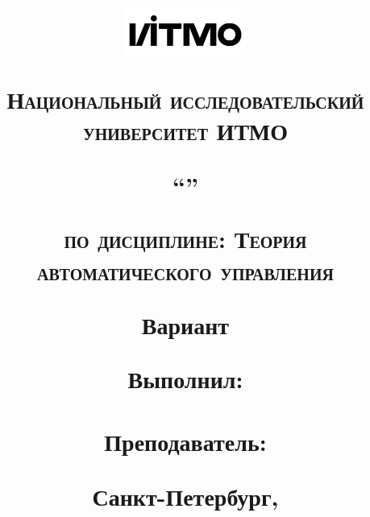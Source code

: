 \begin{titlepage}

  \thispagestyle{empty}
  
  \title{


  \includegraphics[width=4cm]{media/ITMO_logo.png} 

  \begin{center}
  \large\textsc{\textbf{Национальный исследовательский университет ИТМО}}
  \vspace{2em}
  \end{center}


  \begin{center}
    \large\textsc{\textbf{\name}}

    ``\subname'' 

    \large\textsc{\textbf{по дисциплине: Теория автоматического управления}}
    
    Вариант \variant
  \end{center}
  
  
  \vspace{3em}
  
  \begin{flushright}
  \normalsize{ 
  Выполнил: \\ \textbf{\nameu} \\
  Преподаватель: \\ \textbf{\teacher} 
  }
  \end{flushright}	
  
  \vfill
  
  \begin{center}
  \small{Санкт-Петербург, \the\year}
  \end{center}
  }
  
  
  \author{}
  \date{}
  \maketitle
  \thispagestyle{empty}
  \end{titlepage}